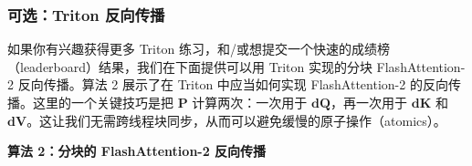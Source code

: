 \subsubsection{可选：Triton 反向传播}

如果你有兴趣获得更多 Triton 练习，和/或想提交一个快速的成绩榜（leaderboard）结果，我们在下面提供可以用 Triton 实现的分块 FlashAttention-2 反向传播。算法 2 展示了在 Triton 中应当如何实现 FlashAttention-2 的反向传播。这里的一个关键技巧是把 $\boldsymbol{P}$ 计算两次：一次用于 $\boldsymbol{dQ}$，再一次用于 $\boldsymbol{dK}$ 和 $\boldsymbol{dV}$。这让我们无需跨线程块同步，从而可以避免缓慢的原子操作（atomics）。

\begin{center}
\textbf{算法 2：分块的 FlashAttention-2 反向传播}
\end{center}

